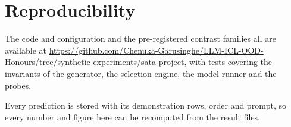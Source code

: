 \section{Reproducibility}
\label{app:repro}

The code and configuration and the pre-registered contrast families all are available at \url{https://github.com/Chenuka-Garusinghe/LLM-ICL-OOD-Honours/tree/synthetic-experiments/sata-project}, with tests covering the invariants of the generator, the selection engine, the model runner and the probes.

Every prediction is stored with its demonstration rows, order and prompt, so every number and figure here can be recomputed from the result files.
